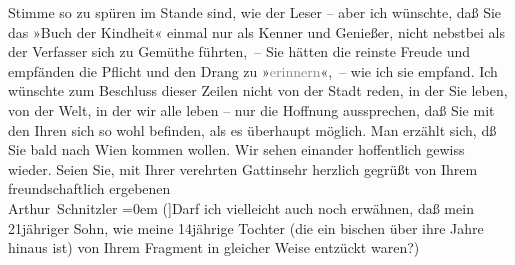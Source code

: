 \begin{ledgroupsized}[t]{13cm}
                    Stimme so zu spüren im Stande sind, wie der Leser – aber ich wünschte, daß Sie
                    das »Buch der Kindheit« einmal nur als Kenner und Genießer, nicht nebstbei als
                    der Verfasser sich zu Gemüthe führten, – Sie hätten die reinste Freude und
                    empfänden die Pflicht und den Drang zu »\textcolor{gray}{erinnern}«, – wie ich
                    sie empfand.\pend
           \pstart
           Ich wünschte zum Beschluss dieser Zeilen {\pb}nicht von der Stadt
                    reden, in der Sie leben, von der Welt, in der wir alle leben – nur die Hoffnung
                    aussprechen, daß Sie mit den Ihren sich so wohl befinden, als es überhaupt
                    möglich. Man erzählt sich, dß Sie bald nach Wien
                    kommen wollen. Wir sehen einander hoffentlich gewiss wieder.\pend
           \pstart
           Seien Sie, mit Ihrer verehrten Gattinsehr herzlich gegrüßt von Ihrem{\\[\baselineskip]}freundschaftlich ergebenen{\\[\baselineskip]}\spacefill\mbox{Arthur Schnitzler}\pend
           \leftskip=0em{}\pstart
           \noindent{}{[}({]}Darf ich vielleicht auch noch erwähnen, daß mein
                        21jähriger Sohn, wie
                        meine 14jährige Tochter
                        (die ein bischen über ihre Jahre hinaus ist) von Ihrem Fragment in gleicher Weise entzückt
                        waren?) \pend
           \endnumbering{}\end{ledgroupsized}  \newcommand{\dateiname}{L02404}\newcommand{\titel}{Arthur Schnitzler an Thomas Mann, 18. 11. 1923}\newcommand{\editorInnen}{Martin Anton Müller und Gerd-Hermann Susen}
            \footnotesize
\begin{ledgroupsized}[t]{11.5cm}
\end{ledgroupsized}
         
      
